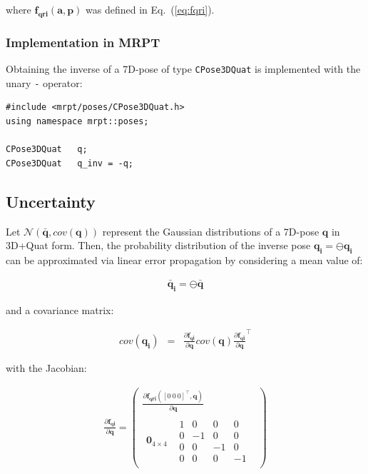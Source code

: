 \documentclass[a4paper,11pt]{report}
\begin{document}
\noindent where $\mathbf{f_{qri}}(\mathbf{a},\mathbf{p})$  was defined in Eq.~(\ref{eq:fqri}).



\subsubsection{Implementation in MRPT}

Obtaining the inverse of a 7D-pose of type \texttt{CPose3DQuat} is implemented
with the unary \texttt{-} operator:

\begin{lstlisting}
#include <mrpt/poses/CPose3DQuat.h>
using namespace mrpt::poses;

CPose3DQuat   q;
CPose3DQuat   q_inv = -q;
\end{lstlisting}


\subsection{Uncertainty}

Let $\mathcal{N}(\mathbf{\bar{q}}, cov(\mathbf{q}))$ represent
the Gaussian distributions of a 7D-pose $\mathbf{q}$ in 3D+Quat form.
Then, the probability distribution of the inverse pose
$\mathbf{q_i} = \ominus \mathbf{q_i} $ can be approximated via
linear error propagation by considering a mean value of:

\begin{eqnarray}
\mathbf{\bar{q}_i} = \ominus \mathbf{\bar{q}}
\end{eqnarray}

\noindent and a covariance matrix:

\begin{eqnarray}
cov(\mathbf{q_i}) &=&
\frac{\partial \mathbf{f_{qi}} }{\partial \mathbf{q}}
cov(\mathbf{q})
\frac{\partial \mathbf{f_{qi}} }{\partial \mathbf{q}} ^\top
\end{eqnarray}

\noindent with the Jacobian:

\begin{eqnarray}
\frac{\partial \mathbf{f_{qi}} }{\partial \mathbf{q}}
=
\left(
\begin{array}{c}
\frac{\partial \mathbf{f_{qri}}([0~0~0]^\top,\mathbf{q}) }{\partial \mathbf{q}} \\
\hline
 \begin{array}{c|c}
   \mathbf{0}_{4 \times 4} &
   \begin{array}{rrrr}
    1 & 0 & 0 & 0 \\
    0 & -1 & 0 & 0 \\
    0 & 0 & -1 & 0 \\
    0 & 0 & 0 & -1
   \end{array}
 \end{array}
\end{array}
\right)
\end{eqnarray}
\end{document}
